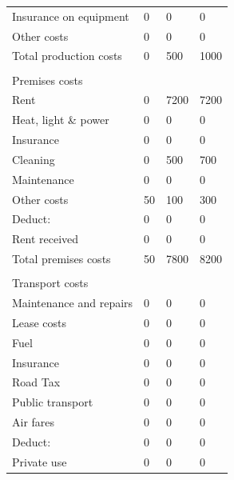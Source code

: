 \documentclass{article}
\begin{document}
\begin{table}[H]
\begin{tabular}{llll}
Insurance on equipment            & 0      & 0      & 0      \\
Other costs                       & 0      & 0      & 0      \\
Total production costs            & 0      & 500    & 1000   \\
                                  &        &        &        \\
Premises costs                    &        &        &        \\
Rent                              & 0      & 7200   & 7200   \\
Heat, light \& power              & 0      & 0      & 0      \\
Insurance                         & 0      & 0      & 0      \\
Cleaning                          & 0      & 500    & 700    \\
Maintenance                       & 0      & 0      & 0      \\
Other costs                       & 50     & 100    & 300    \\
Deduct:                           & 0      & 0      & 0      \\
Rent received                     & 0      & 0      & 0      \\
Total premises costs              & 50     & 7800   & 8200   \\
                                  &        &        &        \\
Transport costs                   &        &        &        \\
Maintenance and repairs           & 0      & 0      & 0      \\
Lease costs                       & 0      & 0      & 0      \\
Fuel                              & 0      & 0      & 0      \\
Insurance                         & 0      & 0      & 0      \\
Road Tax                          & 0      & 0      & 0      \\
Public transport                  & 0      & 0      & 0      \\
Air fares                         & 0      & 0      & 0      \\
Deduct:                           & 0      & 0      & 0      \\
Private use                       & 0      & 0      & 0      \\

\end{tabular}
\end{table}
\end{document}
